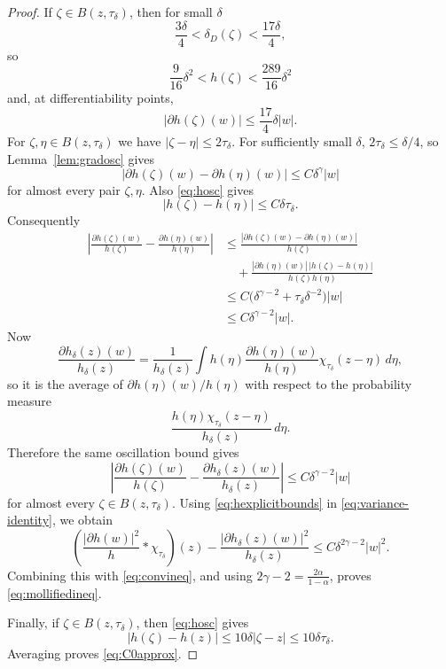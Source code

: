 \documentclass[10pt,a4paper]{amsart}
\begin{document}
\begin{proof}
If $\zeta\in B(z,\tau_\delta)$, then for small $\delta$
\[
 \frac{3\delta}{4}<\delta_D(\zeta)<\frac{17\delta}{4},
\]
so
\begin{equation}\label{eq:hexplicitbounds}
 \frac{9}{16}\delta^2<h(\zeta)<\frac{289}{16}\delta^2
\end{equation}
and, at differentiability points,
\[
 |\partial h(\zeta)(w)|\le\frac{17}{4}\delta|w|.
\]
For $\zeta,\eta\in B(z,\tau_\delta)$ we have
$|\zeta-\eta|\le2\tau_\delta$. For sufficiently small $\delta$,
$2\tau_\delta\le\delta/4$, so Lemma~\ref{lem:gradosc} gives
\[
 |\partial h(\zeta)(w)-\partial h(\eta)(w)|
 \le C\delta^\gamma|w|
\]
for almost every pair $\zeta,\eta$. Also
\eqref{eq:hosc} gives
\[
 |h(\zeta)-h(\eta)|\le C\delta\tau_\delta.
\]
Consequently
\begin{align*}
 \left|
 \frac{\partial h(\zeta)(w)}{h(\zeta)}
 -\frac{\partial h(\eta)(w)}{h(\eta)}
 \right|
 &\le
 \frac{|\partial h(\zeta)(w)-\partial h(\eta)(w)|}{h(\zeta)}\\
 &\quad+
 \frac{|\partial h(\eta)(w)|\,|h(\zeta)-h(\eta)|}
 {h(\zeta)h(\eta)}\\
 &\le C\bigl(\delta^{\gamma-2}+\tau_\delta\delta^{-2}\bigr)|w|\\
 &\le C\delta^{\gamma-2}|w|.
\end{align*}
Now
\[
 \frac{\partial h_\delta(z)(w)}{h_\delta(z)}
 =\frac{1}{h_\delta(z)}
 \int h(\eta)\frac{\partial h(\eta)(w)}{h(\eta)}
 \chi_{\tau_\delta}(z-\eta)\,d\eta,
\]
so it is the average of $\partial h(\eta)(w)/h(\eta)$ with respect to the
probability measure
\[
 \frac{h(\eta)\chi_{\tau_\delta}(z-\eta)}{h_\delta(z)}\,d\eta.
\]
Therefore the same oscillation bound gives
\[
 \left|
 \frac{\partial h(\zeta)(w)}{h(\zeta)}
 -\frac{\partial h_\delta(z)(w)}{h_\delta(z)}
 \right|
 \le C\delta^{\gamma-2}|w|
\]
for almost every $\zeta\in B(z,\tau_\delta)$. Using
\eqref{eq:hexplicitbounds} in \eqref{eq:variance-identity}, we obtain
\[
 \left(\frac{|\partial h(w)|^2}{h}*\chi_{\tau_\delta}\right)(z)
 -\frac{|\partial h_\delta(z)(w)|^2}{h_\delta(z)}
 \le C\delta^{2\gamma-2}|w|^2.
\]
Combining this with \eqref{eq:convineq}, and using
$2\gamma-2=\frac{2\alpha}{1-\alpha}$, proves
\eqref{eq:mollifiedineq}.

Finally, if $\zeta\in B(z,\tau_\delta)$, then \eqref{eq:hosc} gives
\[
 |h(\zeta)-h(z)|\le10\delta|\zeta-z|\le10\delta\tau_\delta.
\]
Averaging proves \eqref{eq:C0approx}.
\end{proof}
\end{document}
